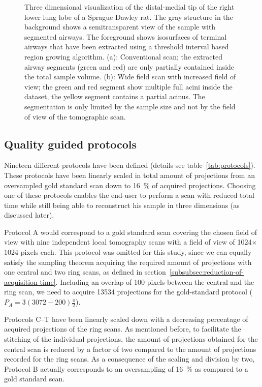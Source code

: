\begin{figure}[htp]
{%
		}%
		\caption{Three dimensional visualization of the distal-medial tip of the right lower lung lobe of a Sprague Dawley rat. The gray structure in the background shows a semitransparent view of the sample with segmented airways. The foreground shows isosurfaces of terminal airways that have been extracted using a threshold interval based region growing algorithm. (a): Conventional scan; the extracted airway segments (green and red) are only partially contained inside the total sample volume. (b): Wide field scan with increased field of view; the green and red segment show multiple full acini inside the dataset, the yellow segment contains a partial acinus. The segmentation is only limited by the sample size and not by the field of view of the tomographic scan.}%
		\label{fig:s2-wfs}%
	\end{figure}
\fi

\subsection{Quality guided protocols}\label{subsec:quality-guided-protocols}%
Nineteen different protocols have been defined (details see table~\ref{tab:protocols}). These protocols have been linearly scaled in total amount of projections from an oversampled gold standard scan down to \SI{16}{\percent} of acquired projections. Choosing one of these protocols enables the end-user to perform a scan with reduced total time while still being able to reconstruct his sample in three dimensions (as discussed later).

Protocol A would correspond to a gold standard scan covering the chosen field of view with nine independent local tomography scans with a field of view of 1024$\times$1024 pixels each. This protocol was omitted for this study, since we can equally satisfy the sampling theorem acquiring the required amount of projections with one central and two ring scans, as defined in section~\ref{subsubsec:reduction-of-acquisition-time}. Including an overlap of 100 pixels between the central and the ring scan, we need to acquire 13534 projections for the gold-standard protocol ($P_{A}=3(3072-200)\frac{\pi}{2}$).

Protocols C--T have been linearly scaled down with a decreasing percentage of acquired projections of the ring scans. As mentioned before, to facilitate the stitching of the individual projections, the amount of projections obtained for the central scan is reduced by a factor of two compared to the amount of projections recorded for the ring scans. As a consequence of the scaling and division by two, Protocol B actually corresponds to an oversampling of \SI{16}{\percent} as compared to a gold standard scan.

